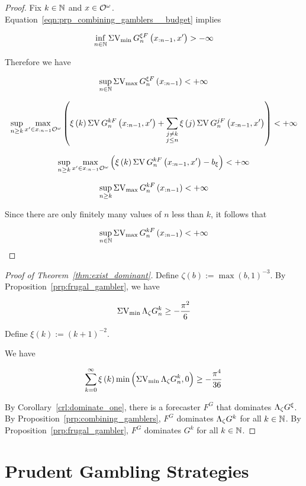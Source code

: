 \begin{proof}

Fix $k \in \mathbb{N}$ and $x \in \mathcal{O}^\omega$. Equation~\ref{eqn:prp_combining_gamblers__budget} implies

\[\inf_{n \in \mathbb{N}} \operatorname{\Sigma V_{\min}} G^{\xi F}_{n}\left(x_{:n-1},x'\right) > -\infty\]

Therefore we have

\[\sup_{n \in \mathbb{N}} \operatorname{\Sigma V_{\max}} G^{\xi F}_{n}\left(x_{:n-1}\right) < +\infty\]

\[\sup_{n \geq k} \max_{x' \in x_{:n-1}\mathcal{O}^\omega} \left(\xi\left(k\right) \operatorname{\Sigma V} G^{k F}_{n}\left(x_{:n-1},x'\right) + \sum_{\substack{j \ne k\\ j \leq n}} \xi\left(j\right) \operatorname{\Sigma V} G^{j F}_{n}\left(x_{:n-1},x'\right)\right) < +\infty\]

\[\sup_{n \geq k} \max_{x' \in x_{:n-1}\mathcal{O}^\omega} \left(\xi\left(k\right) \operatorname{\Sigma V} G^{k F}_{n}\left(x_{:n-1},x'\right) - b_\xi\right) < +\infty\]

\[\sup_{n \geq k} \operatorname{\Sigma V_{\max}} G^{k F}_{n}\left(x_{:n-1}\right) < +\infty\]

Since there are only finitely many values of $n$ less than $k$, it follows that

\[\sup_{n \in \mathbb{N}} \operatorname{\Sigma V_{\max}} G^{k F}_{n}\left(x_{:n-1}\right) < +\infty\]
\end{proof}

\begin{proof}[Proof of Theorem~\ref{thm:exist_dominant}]

Define $\zeta\left(b\right) := \max\left(b,1\right)^{-3}$. By Proposition~\ref{prp:frugal_gambler}, we have

\[\operatorname{\Sigma V_{\min}} \Lambda_{\zeta} G^k_n \geq -\frac{\pi^2}{6}\]

Define $\xi\left(k\right):=\left(k+1\right)^{-2}$.

We have

\[\sum_{k=0}^\infty \xi\left(k\right) \min\left(\operatorname{\Sigma V_{\min}} \Lambda_{\zeta} G^k_n, 0\right) \geq -\frac{\pi^4}{36} \]

By Corollary~\ref{crl:dominate_one}, there is a forecaster $F^G$ that dominates $\Lambda_\zeta G^\xi$. By Proposition~\ref{prp:combining_gamblers}, $F^G$ dominates $\Lambda_\zeta G^k$ for all $k \in \mathbb{N}$. By Proposition~\ref{prp:frugal_gambler}, $F^G$ dominates $G^k$ for all $k \in \mathbb{N}$.
\end{proof}

\section{Prudent Gambling Strategies}
\label{sec:prudent}

